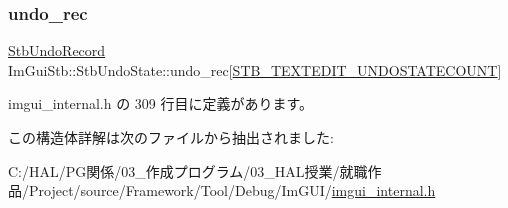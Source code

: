\mbox{\label{struct_im_gui_stb_1_1_stb_undo_state_a3cba4c0766038584aa310a52e763bbda}} 
\subsubsection{\texorpdfstring{undo\+\_\+rec}{undo\_rec}}
{\footnotesize\ttfamily \mbox{\hyperlink{struct_im_gui_stb_1_1_stb_undo_record}{Stb\+Undo\+Record}} Im\+Gui\+Stb\+::\+Stb\+Undo\+State\+::undo\+\_\+rec\mbox{[}\mbox{\hyperlink{stb__textedit_8h_afa79483143df87a1497010712b3dfaf9}{S\+T\+B\+\_\+\+T\+E\+X\+T\+E\+D\+I\+T\+\_\+\+U\+N\+D\+O\+S\+T\+A\+T\+E\+C\+O\+U\+NT}}\mbox{]}}



 imgui\+\_\+internal.\+h の 309 行目に定義があります。



この構造体詳解は次のファイルから抽出されました\+:\begin{DoxyCompactItemize}
\item 
C\+:/\+H\+A\+L/\+P\+G関係/03\+\_\+作成プログラム/03\+\_\+\+H\+A\+L授業/就職作品/\+Project/source/\+Framework/\+Tool/\+Debug/\+Im\+G\+U\+I/\mbox{\hyperlink{imgui__internal_8h}{imgui\+\_\+internal.\+h}}\end{DoxyCompactItemize}
